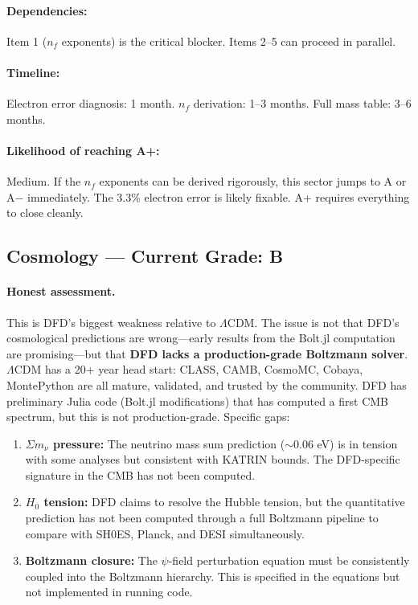 \documentclass[11pt,a4paper]{article}
\begin{document}
\paragraph{Dependencies:} Item 1 ($n_f$ exponents) is the critical blocker. Items 2--5 can proceed in parallel.

\paragraph{Timeline:} Electron error diagnosis: 1 month. $n_f$ derivation: 1--3 months. Full mass table: 3--6 months.

\paragraph{Likelihood of reaching A+:} \textcolor{gradeBplus}{Medium}. If the $n_f$ exponents can be derived rigorously, this sector jumps to A or A$-$ immediately. The 3.3\% electron error is likely fixable. A+ requires everything to close cleanly.

\subsection{Cosmology --- Current Grade: B}

\paragraph{Honest assessment.}
This is DFD's biggest weakness relative to $\Lambda$CDM. The issue is not that DFD's cosmological predictions are wrong---early results from the Bolt.jl computation are promising---but that \textbf{DFD lacks a production-grade Boltzmann solver}. $\Lambda$CDM has a 20+ year head start: CLASS, CAMB, CosmoMC, Cobaya, MontePython are all mature, validated, and trusted by the community. DFD has preliminary Julia code (Bolt.jl modifications) that has computed a first CMB spectrum, but this is not production-grade. Specific gaps:
\begin{enumerate}[label=(\alph*)]
    \item \textbf{$\Sigma m_\nu$ pressure:} The neutrino mass sum prediction ($\sim$0.06 eV) is in tension with some analyses but consistent with KATRIN bounds. The DFD-specific signature in the CMB has not been computed.
    \item \textbf{$H_0$ tension:} DFD claims to resolve the Hubble tension, but the quantitative prediction has not been computed through a full Boltzmann pipeline to compare with SH0ES, Planck, and DESI simultaneously.
    \item \textbf{Boltzmann closure:} The $\psi$-field perturbation equation must be consistently coupled into the Boltzmann hierarchy. This is specified in the equations but not implemented in running code.
\end{enumerate}
\end{document}
